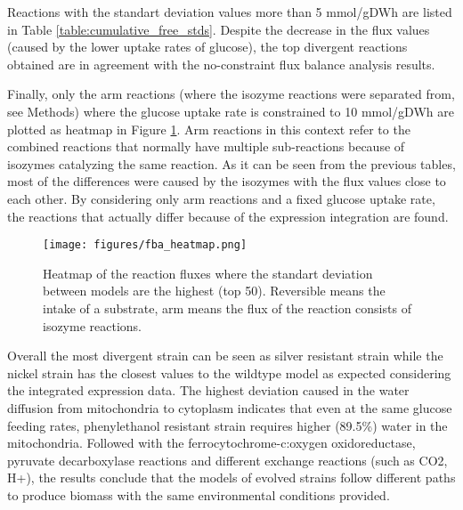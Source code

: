 Reactions with the standart deviation values more than 5 mmol/gDWh are listed in Table \ref{table:cumulative_free_stds}. Despite the decrease in the flux values (caused by the lower uptake rates of glucose), the top divergent reactions obtained are in agreement with the no-constraint flux balance analysis results.



Finally, only the arm reactions (where the isozyme reactions were separated from, see Methods) where the glucose uptake rate is constrained to 10 mmol/gDWh are plotted as heatmap in Figure \ref{fig:fba_heatmap}. Arm reactions in this context refer to the combined reactions that normally have multiple sub-reactions because of isozymes catalyzing the same reaction. As it can be seen from the previous tables, most of the differences were caused by the isozymes with the flux values close to each other. By considering only arm reactions and a fixed glucose uptake rate, the reactions that actually differ because of the expression integration are found.

\begin{figure}[H]
  \begin{center}
  \texttt{[image: figures/fba\_heatmap.png]}
  \caption[Heatmap of the reaction fluxes where the standart deviation between models are the highest (top 50). Reversible means the intake of a substrate, arm means the flux of the reaction consists of isozyme reactions]{Heatmap of the reaction fluxes where the standart deviation between models are the highest (top 50). Reversible means the intake of a substrate, arm means the flux of the reaction consists of isozyme reactions.}
  \label{fig:fba_heatmap}
  \end{center}
\end{figure}

Overall the most divergent strain can be seen as silver resistant strain while the nickel strain has the closest values to the wildtype model as expected considering the integrated expression data. The highest deviation caused in the water diffusion from mitochondria to cytoplasm indicates that even at the same glucose feeding rates, phenylethanol resistant strain requires higher (89.5\%) water in the mitochondria. Followed with the ferrocytochrome-c:oxygen oxidoreductase, pyruvate decarboxylase reactions and different exchange reactions (such as CO2, H+), the results conclude that the models of evolved strains follow different paths to produce biomass with the same environmental conditions provided.


